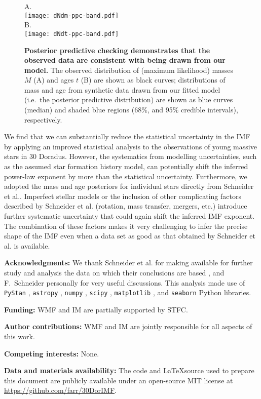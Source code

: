 \documentclass[12pt]{article}
\begin{document}
\begin{figure}
    		    A.\\		\texttt{[image: dNdm-ppc-band.pdf]}\\
               B.\\  \texttt{[image: dNdt-ppc-band.pdf]}
    		\caption{{\bf Posterior predictive checking demonstrates that the observed data are consistent with being drawn from our model.} The observed distribution of (maximum likelihood) masses $M$ (A) and ages $t$ (B) are shown as black curves; distributions of mass and age from synthetic data drawn from our fitted model (i.e.\ the posterior predictive distribution) are shown as blue curves (median) and shaded blue regions (68\%, and 95\% credible intervals), respectively.}\label{fig:PPC}
\end{figure}


We find that we can substantially reduce the statistical uncertainty in the IMF by applying an improved statistical analysis to the observations of young massive stars in 30 Doradus.  However, the systematics from modelling uncertainties, such as the assumed star formation history model, can potentially shift the inferred power-law exponent by more than the statistical uncertainty.   Furthermore, we adopted the mass and age posteriors for individual stars directly from Schneider et al.\cite{Schneider:2018}.  Imperfect stellar models or the inclusion of other complicating factors described by Schneider et al.\cite{Schneider:2018} (rotation, mass transfer, mergers, etc.) introduce further systematic uncertainty that could again shift the inferred IMF exponent.  The combination of these factors makes it very challenging to infer the precise shape of the IMF even when a data set as good as that obtained by Schneider et al.\cite{Schneider:2018} is available.



{\bf Acknowledgments:} We thank Schneider et al.\cite{Schneider:2018} for making available for further study and analysis the data on which their conclusions are based , and F.~Schneider personally for very useful discussions.  This analysis made use of \texttt{PyStan} \cite{STAN}, \texttt{astropy} \cite{astropy}, \texttt{numpy} \cite{numpy}, \texttt{scipy} \cite{scipy}, \texttt{matplotlib} \cite{matplotlib}, and \texttt{seaborn} \cite{seaborn} Python libraries.

{\bf Funding:} WMF and IM are partially supported by STFC.

{\bf Author contributions:} WMF and IM are jointly responsible for all aspects of this work.

{\bf Competing interests:} None.

{\bf Data and materials availability:} The code and \LaTeX source used to prepare this document are publicly available under an open-source MIT license at \url{https://github.com/farr/30DorIMF}.



\end{document}
